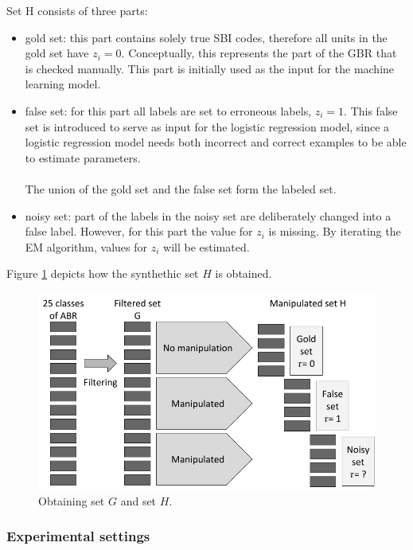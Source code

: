 \documentclass[12pt, a4paper, titlepage]{article}
\begin{document}
Set H consists of three parts:
\begin{itemize}
\item gold set: this part contains solely true SBI codes, therefore all units in the gold set have $z_i = 0$. Conceptually, this represents the part of the GBR that is checked manually. This part is initially used as the input for the machine learning model.
\item false set: for this part all labels are set to erroneous labels, $z_i = 1$. This false set is introduced to serve as input for the logistic regression model, since a logistic regression model needs both incorrect and correct examples to be able to estimate parameters.\\
\\
The union of the gold set and the false set form the labeled set.
\item noisy set: part of the labels in the noisy set are deliberately changed into a false label. However, for this part the value for $z_i$ is missing. By iterating the EM algorithm, values for $z_i$ will be estimated.
\end{itemize}

Figure \ref{fig1} depicts how the synthethic set $H$ is obtained.

\begin{figure}[h]
\includegraphics[width=\linewidth]{Synthethic set2}
\caption{Obtaining set $G$ and set $H$.}
\label{fig1}
\end{figure}

					\subsubsection{Experimental settings}
					\label{section:settings}
\end{document}

